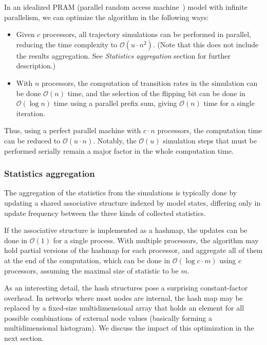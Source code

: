 \documentclass[sn-mathphys-num]{sn-jnl}%
\begin{document}
In an idealized PRAM (parallel random access machine~\cite{fortune1978parallelism}) model with infinite parallelism, we can optimize the algorithm in the following ways:
\begin{itemize}
    \item Given $c$ processors, all trajectory simulations can be performed in parallel, reducing the time complexity to $\mathcal{O}(u \cdot n^2)$. (Note that this does not include the results aggregation. See \emph{Statistics aggregation} section for further description.)
    \item With $n$ processors, the computation of transition rates in the simulation can be done $\mathcal{O}(n)$ time, and the selection of the flipping bit can be done in $\mathcal{O}(\log{n})$ time using a parallel prefix sum, giving $\mathcal{O}(n)$ time for a single iteration.
\end{itemize}
Thus, using a perfect parallel machine with $c \cdot n$ processors, the computation time can be reduced to $\mathcal{O}(u \cdot n)$. Notably, the $\mathcal{O}(u)$ simulation steps that must be performed serially remain a major factor in the whole computation time.

\subsubsection{Statistics aggregation}

The aggregation of the statistics from the simulations is typically done by updating a shared associative structure indexed by model states, differing only in update frequency between the three kinds of collected statistics.

If the associative structure is implemented as a hashmap, the updates can be done in $\mathcal{O}(1)$ for a single process. With multiple processors, the algorithm may hold partial versions of the hashmap for each processor, and aggregate all of them at the end of the computation, which can be done in $\mathcal{O}(\log{c} \cdot m)$ using $c$ processors, assuming the maximal size of statistic to be $m$.

As an interesting detail, the hash structures pose a surprising constant-factor overhead. In networks where most nodes are internal, the hash map may be replaced by a fixed-size multidimensional array that holds an element for all possible combinations of external node values (basically forming a multidimensional histogram). We discuss the impact of this optimization in the next section.
\end{document}
